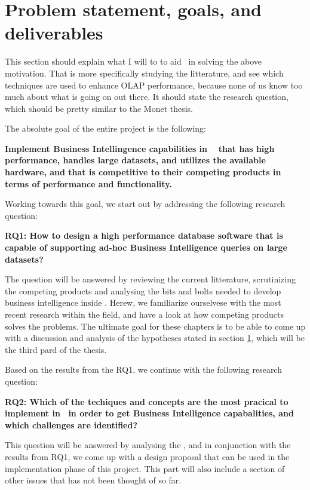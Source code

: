 \section{Problem statement, goals, and deliverables}
\label{sec:problem-statement-and-goals}
\begin{secex}
This section should explain what I will to to aid \genus~in solving the above motivation. That is more specifically studying the litterature, and see which techniques are used to enhance OLAP performance, because none of us know too much about what is going on out there. It should state the research question, which should be pretty similar to the Monet thesis.
\end{secex}

The absolute goal of the entire project is the following: 

\textbf{Implement Business Intellingence capabilities in \genusSoftware~ that has high performance, handles large datasets, and utilizes the available hardware, and that is competitive to their competing products in terms of performance and functionality.}

Working towards this goal, we start out by addressing the following research question:

\textbf{RQ1: How to design a high performance database software that is capable of supporting ad-hoc Business Intelligence queries on large datasets?}

The question will be answered by reviewing the current litterature, scrutinizing the competing products and analysing the bits and bolts needed to develop business intelligence inside \genusSoftware. Herew, we familiarize ourselvese with the most recent research within the field, and have a look at how competing products solves the problems. The ultimate goal for these chapters is to be able to come up with a discussion and analysis of the hypotheses stated in section \ref{sec:problem-statement-and-goals}, which will be the third pard of the thesis.

Based on the results from the RQ1, we continue with the following research question:

\textbf{RQ2: Which of the techiques and concepts are the most pracical to implement in \genusSoftware~in order to get Business Intelligence capabalities, and which challenges are identified?}

This question will be answered by analysing the \genusSoftware, and in conjunction with the results from RQ1, we come up with a design proposal that can be used in the implementation phase of this project. This part will also include a section of other issues that has not been thought of so far.

